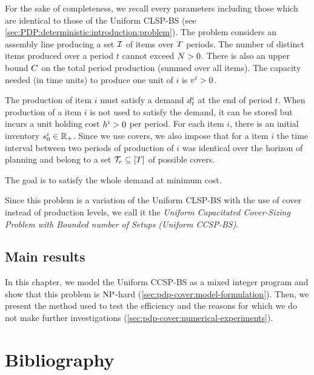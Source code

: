 For the sake of completeness, we recall every parameters including those which are identical to those of the Uniform CLSP-BS (see \cref{sec:PDP:deterministic:introduction:problem}).
The problem considers an assembly line producing a set $\mathcal{I}$ of items over $T$ periods.
The number of distinct items produced over a period $t$ cannot exceed $N>0$.
There is also an upper bound $C$ on the total period production (summed over all items).
The capacity needed (in time units) to produce one unit of $i$ is $v^i>0$.


The production of item $i$ must satisfy a demand $d_t^i$ at the end of period $t$.
When production of a item $i$ is not used to satisfy the demand, it can be stored but incurs a unit holding cost $h^i>0$ per period.
For each item $i$, there is an initial inventory $s_0^i\in\mathbb{R}_+$.
Since we use covers, we also impose that for a item $i$ the time interval between two periods of production of $i$ was identical over the horizon of planning and belong to a set $\coverset_r\subseteq\range{\horizon}$ of possible covers.


The goal is to satisfy the whole demand at minimum cost.


Since this problem is a variation of the Uniform CLSP-BS with the use of cover instead of production levels, we call it the \emph{Uniform Capacitated Cover-Sizing Problem with Bounded number of Setups (Uniform CCSP-BS)}.



\subsection{Main results}


In this chapter, we model the Uniform CCSP-BS as a mixed integer program and show that this problem is $\operatorname{NP}$-hard (\cref{sec:pdp-cover:model-formulation}).
Then, we present the method used to test the efficiency and the reasons for which we do not make further investigations (\cref{sec:pdp-cover:numerical-experiments}).



\section{Bibliography}


